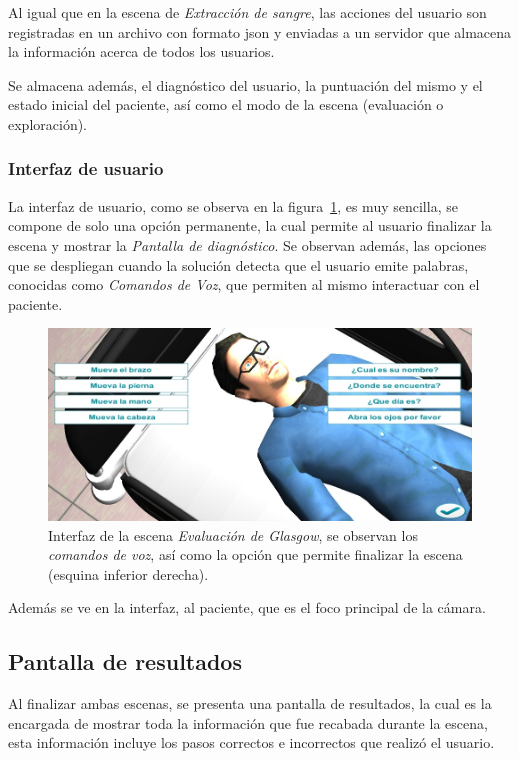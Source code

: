 Al igual que en la escena de \emph{Extracción de sangre}, las acciones del usuario
son registradas en un archivo con formato \Gls{json} y enviadas a un servidor
que almacena la información acerca de todos los usuarios.

Se almacena además, el diagnóstico del usuario, la puntuación del mismo y el
estado inicial del paciente, así como el modo de la escena (evaluación o
exploración).

\subsubsection{Interfaz de usuario}

La interfaz de usuario, como se observa en la figura~\ref{fig:glasgow_gui}, es
muy sencilla, se compone de solo una opción permanente, la cual permite al
usuario finalizar la escena y mostrar la \emph{Pantalla de diagnóstico}. Se
observan además, las opciones que se despliegan cuando la solución detecta que el
usuario emite palabras, conocidas como \emph{Comandos de Voz}, que permiten al
mismo interactuar con el paciente.

\begin{figure}[H]
\centering
\includegraphics[scale=0.5]{propuesta/glasgow_comandos_voz.jpg}
\caption{Interfaz de la escena \emph{Evaluación de Glasgow}, se observan los
    \emph{comandos de voz}, así como la opción que permite finalizar la escena
    (esquina inferior derecha).}
\label{fig:glasgow_gui}
\end{figure}

Además se ve en la interfaz, al paciente, que es el foco principal de la cámara.

\subsection{Pantalla de resultados}

Al finalizar ambas escenas, se presenta una pantalla de resultados, la cual es
la encargada de mostrar toda la información que fue recabada durante la escena,
esta información incluye los pasos correctos e incorrectos que realizó el
usuario.

